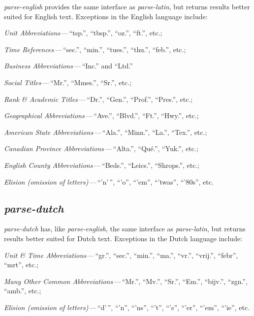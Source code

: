 \emph{parse-english} provides the same interface as \emph{parse-latin}, but
  returns results better suited for English text.
Exceptions in the English language include:

\begin{aenumerate}
\item \emph{Unit Abbreviations}\,---\,``tsp.'', ``tbsp.'', ``oz.'', ``ft.'',
  etc.;
\item\emph{Time References}\,---\,``sec.'', ``min.'', ``tues.'', ``thu.'',
  ``feb.'', etc.;
\item\emph{Business Abbreviations}\,---\,``Inc.'' and ``Ltd.''
\item\emph{Social Titles}\,---\,``Mr.'', ``Mmes.'', ``Sr.'', etc.;
\item\emph{Rank \& Academic Titles}\,---\,``Dr.'', ``Gen.'', ``Prof.'',
  ``Pres.'', etc.;
\item\emph{Geographical Abbreviations}\,---\,``Ave.'', ``Blvd.'', ``Ft.'',
  ``Hwy.'', etc.;
\item\emph{American State Abbreviations}\,---\,``Ala.'', ``Minn.'', ``La.'',
  ``Tex.'', etc.;
\item\emph{Canadian Province Abbreviations}\,---\,``Alta.'', ``Qué.'',
  ``Yuk.'', etc.;
\item\emph{English County Abbreviations}\,---\,``Beds.'', ``Leics.'',
  ``Shrops.'', etc.;
\item\emph{Elision (omission of letters)}\,---\,``'n'\,'', ``'o'', ``'em'',
  ``'twas'', ``'80s'', etc.
\end{aenumerate}

\subsection{\emph{parse-dutch}}\label{parse-dutch}

\emph{parse-dutch} has, like \emph{parse-english}, the same interface as
  \emph{parse-latin}, but returns results better suited for Dutch text.
Exceptions in the Dutch language include:

\begin{aenumerate}
\item\emph{Unit \& Time Abbreviations}\,---\,``gr.'', ``sec.'', ``min.'', ``ma.'',
  ``vr.'', ``vrij.'', ``febr'', ``mrt'', etc.;
\item\emph{Many Other Common Abbreviations}\,---\,``Mr.'', ``Mv.'', ``Sr.'',
  ``Em.'', ``bijv.'', ``zgn.'', ``amb.'', etc.;
\item\emph{Elision (omission of letters)}\,---\,``d'\,'', ``'n'', ``'ns'',
  ``'t'', ``'s'', ``'er'', ``'em'', ``'ie'', etc.
\end{aenumerate}

